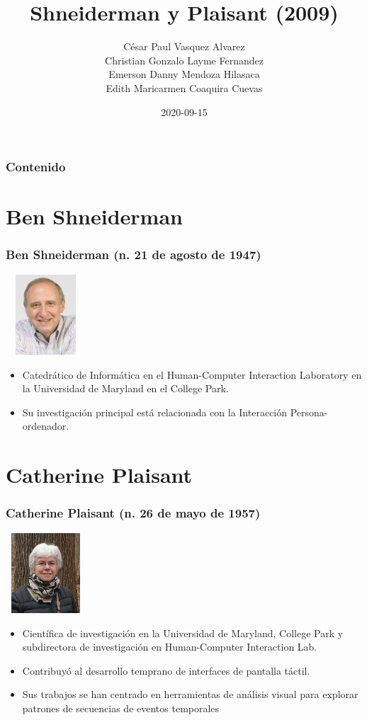 \documentclass[11pt]{beamer}
\title[Interfaz de usuario]{\bf\Huge Shneiderman y Plaisant (2009)}
\subtitle{}
\author[Grupo 12]
{
	César Paul Vasquez Alvarez \\
	Christian Gonzalo Layme Fernandez \\
	Emerson Danny  Mendoza Hilasaca \\
	Edith Maricarmen Coaquira Cuevas  
}
\institute[UNSA]
\date[2020-09-15]{\scriptsize{2020-09-15}}
\begin{document}
\begin{frame}
\titlepage
\end{frame}

\begin{frame}
\frametitle{Contenido}
\tableofcontents
\end{frame}

\section{Ben Shneiderman}
\begin{frame}
\frametitle{Ben Shneiderman (n. 21 de agosto de 1947)}
\includegraphics[width=3.0cm,height=3.0cm]{img/ben.jpg}\centering

\begin{itemize}
\item Catedrático de Informática en el Human-Computer Interaction Laboratory en la Universidad de Maryland en el College Park.
\item Su investigación principal está relacionada con la Interacción Persona-ordenador.
\end{itemize}
\end{frame}


\section{Catherine Plaisant}
\begin{frame}
\frametitle{Catherine Plaisant (n. 26 de mayo de 1957)}
\includegraphics[width=3.0cm,height=3.0cm]{img/plaisant.jpg}\centering

\begin{itemize}
\item Científica de investigación en la Universidad de Maryland, College Park y subdirectora de investigación en Human-Computer Interaction Lab.
\item Contribuyó al desarrollo temprano de interfaces de pantalla táctil.
\item Sus trabajos se han centrado en herramientas de análisis visual para explorar patrones de secuencias de eventos temporales
\end{itemize}
\end{frame}
\end{document}
